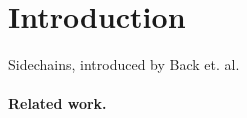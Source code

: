 \section{Introduction}

Sidechains, introduced by Back et. al.~\cite{sidechains}

\paragraph{Related work. }
